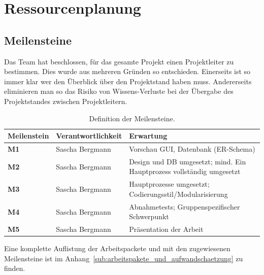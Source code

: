 \section{Ressourcenplanung}
\subsection{Meilensteine}
Das Team hat beschlossen, für das gesamte Projekt einen Projektleiter zu bestimmen. Dies wurde aus mehreren Gründen so entschieden.
Einerseits ist so immer klar wer den Überblick über den Projektstand haben muss. Andererseits eliminieren man so das Risiko von Wissens-Verluste bei der Übergabe des Projektstandes zwischen Projektleitern.\\

\begin{table}[H]
\centering
\begin{tabularx}{\textwidth-1cm}{|l|l|X|} \hline
\textbf{Meilenstein}	& \textbf{Verantwortlichkeit} &	\textbf{Erwartung} \\ \hline
\textbf{M1}	&Sascha Bergmann	&Vorschau GUI, Datenbank (ER-Schema) \\  \hline
\textbf{M2}	&Sascha Bergmann	&Design und DB umgesetzt; mind. Ein Hauptprozess vollständig umgesetzt \\ \hline
\textbf{M3}	&Sascha Bergmann	&Hauptprozesse umgesetzt; Codierungsstil/Modularisierung \\ \hline
\textbf{M4}	&Sascha Bergmann	&Abnahmetests; Gruppenspezifischer Schwerpunkt \\ \hline
\textbf{M5}	&Sascha Bergmann	&Präsentation der Arbeit \\ \hline
\end{tabularx}
\caption{Definition der Meilensteine.}
\end{table}

Eine komplette Auflistung der Arbeitspackete und mit den zugewiesenen Meilensteine ist im Anhang~\ref{sub:arbeitspakete_und_aufwandschaetzung} zu finden.  

